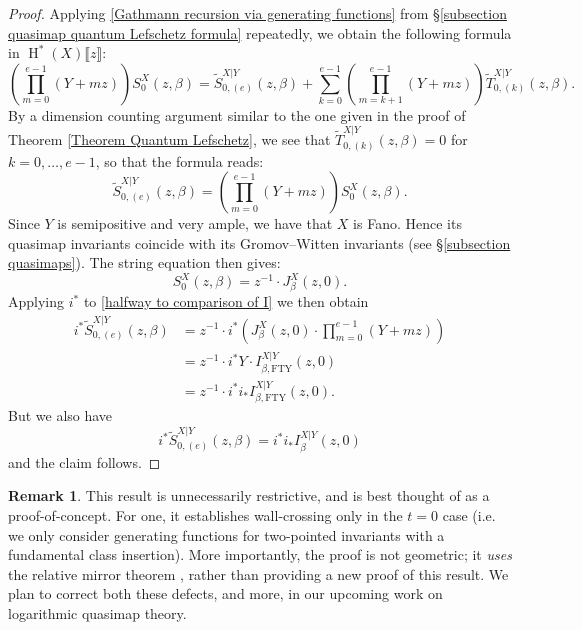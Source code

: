 \documentclass[10pt]{amsart}
\newcommand{\HH}{\operatorname{H}}
\theoremstyle{definition}
\theoremstyle{definition}
\newtheorem{remark}[thm]{Remark}
\begin{document}
\begin{proof}
Applying \eqref{Gathmann recursion via generating functions} from \S \ref{subsection quasimap quantum Lefschetz formula} repeatedly, we obtain the following formula in $\HH^*(X)\llbracket z \rrbracket$:
\begin{equation*} \left( \prod_{m=0}^{e-1} (Y+mz) \right) S^{X}_{0}(z,\beta) = \widetilde{S}_{0,(e)}^{X|Y}(z,\beta) + \sum_{k=0}^{e-1} \left(\prod_{m=k+1}^{e-1}(Y+mz) \right) \widetilde{T}^{X|Y}_{0,(k)}(z,\beta).\end{equation*}
By a dimension counting argument similar to the one given in the proof of Theorem \ref{Theorem Quantum Lefschetz}, we see that $\widetilde{T}^{X|Y}_{0,(k)}(z,\beta)=0$ for $k=0,\ldots,e-1$, so that the formula reads:
\begin{equation}\label{halfway to comparison of I} \widetilde{S}^{X|Y}_{0,(e)}(z,\beta) = \left( \prod_{m=0}^{e-1}(Y+mz) \right) S_{0}^X(z,\beta).\end{equation}
Since $Y$ is semipositive and very ample, we have that $X$ is Fano. Hence its quasimap invariants coincide with its Gromov--Witten invariants (see \S \ref{subsection quasimaps}). The string equation then gives:
\begin{equation*} S^X_{0}(z,\beta) = z^{-1} \cdot J^X_\beta(z,0).\end{equation*}
Applying $i^*$ to \eqref{halfway to comparison of I} we then obtain
\begin{align*} i^* \widetilde{S}^{X|Y}_{0,(e)}(z,\beta) & = z^{-1}\cdot i^* \left(J^X_\beta(z,0) \cdot \prod_{m=0}^{e-1}(Y+mz) \right) \\
& = z^{-1} \cdot i^*Y \cdot I_{\beta,\mathrm{FTY}}^{X|Y}(z,0)\\
& = z^{-1} \cdot i^* i_* I_{\beta,\mathrm{FTY}}^{X|Y}(z,0).\end{align*}
But we also have
\begin{equation*} i^* \widetilde{S}_{0,(e)}^{X|Y}(z,\beta) = i^* i_* I_\beta^{X|Y}(z,0)\end{equation*}
and the claim follows.\end{proof}

\begin{remark} This result is unnecessarily restrictive, and is best thought of as a proof-of-concept. For one, it establishes wall-crossing only in the $t=0$ case (i.e. we only consider generating functions for two-pointed invariants with a fundamental class insertion). More importantly, the proof is not geometric; it \emph{uses} the relative mirror theorem \cite[Theorem 4.3]{FanTsengYou}, rather than providing a new proof of this result. We plan to correct both these defects, and more, in our upcoming work on logarithmic quasimap theory.
\end{remark}
\end{document}
